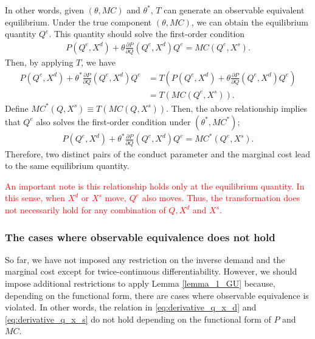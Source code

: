 \documentclass[11pt, a4paper]{article}
\theoremstyle{remark}
\begin{document}
In other words, given $(\theta, MC)$ and $\theta^{*}$, $T$ can generate an observable equivalent equilibrium.
Under the true component $(\theta, MC)$, we can obtain the equilibrium quantity $Q^{e}$.
This quantity should solve the first-order condition 
\begin{align}
    P(Q^e, X^d) + \theta \frac{\partial P}{\partial Q}(Q^e, X^d) Q^e = MC(Q^e, X^{s}).
\end{align}
Then, by applying $T$, we have
\begin{align}
    P(Q^e, X^d) + \theta^{*} \frac{\partial P}{\partial Q}(Q^e, X^d) Q^e 
    & = T\left(P(Q^e, X^d) + \theta \frac{\partial P}{\partial Q}(Q^e, X^d) Q^e\right) \\
    &= T( MC(Q^e, X^{s})).
\end{align}
Define $MC^{*}(Q, X^{s}) \equiv T(MC(Q, X^{s}))$.
Then, the above relationship implies that $Q^{e}$ also solves the first-order condition under $(\theta^{*}, MC^{*})$;
\begin{align}
    P(Q^e, X^d) + \theta^{*} \frac{\partial P}{\partial Q}(Q^e, X^d) Q^e = MC^{*}(Q^e, X^{s}).
\end{align}
Therefore, two distinct pairs of the conduct parameter and the marginal cost lead to the same equilibrium quantity.

\textcolor{red}{An important note is this relationship holds only at the equilibrium quantity. 
In this sense, when $X^{d}$ or $X^{s}$ move, $Q^e$ also moves. 
Thus, the transformation does not necessarily hold for any combination of $Q, X^{d}$ and $X^{s}$.}







\subsubsection{The cases where observable equivalence does not hold}
So far, we have not imposed any restriction on the inverse demand and the marginal cost except for twice-continuous differentiability.
However, we should impose additional restrictions to apply Lemma \ref{lemma_1_GU} because, depending on the functional form, there are cases where observable equivalence is violated.
In other words, the relation in \eqref{eq:derivative_q_x_d} and \eqref{eq:derivative_q_x_s} do not hold depending on the functional form of $P$ and $MC$.

\end{document}
